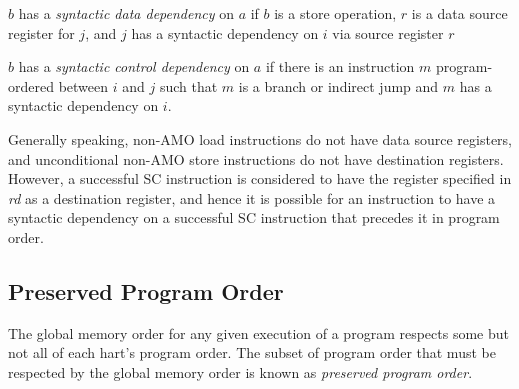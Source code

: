 $b$ has a {\em syntactic data dependency} on $a$ if $b$ is a store operation, $r$ is a data source register for $j$, and $j$ has a syntactic dependency on $i$ via source register $r$

$b$ has a {\em syntactic control dependency} on $a$ if there is an instruction $m$ program-ordered between $i$ and $j$ such that $m$ is a branch or indirect jump and $m$ has a syntactic dependency on $i$.

\begin{commentary}
  Generally speaking, non-AMO load instructions do not have data source registers, and unconditional non-AMO store instructions do not have destination registers.  However, a successful SC instruction is considered to have the register specified in {\em rd} as a destination register, and hence it is possible for an instruction to have a syntactic dependency on a successful SC instruction that precedes it in program order.
\end{commentary}

\subsection*{Preserved Program Order}
The global memory order for any given execution of a program respects some but not all of each hart's program order.
The subset of program order that must be respected by the global memory order is known as {\em preserved program order}.

\newcommand{\ppost}{$b$ is a store, and $a$ and $b$ access overlapping memory addresses}
\newcommand{\ppofence}{There is a FENCE instruction that orders $a$ before $b$}
\newcommand{\ppoacquire}{$a$ has an acquire annotation}
\newcommand{\pporelease}{$b$ has a release annotation}
\newcommand{\pporcsc}{$a$ and $b$ both have RCsc annotations}
\newcommand{\ppoamoforward}{$a$ is generated by an AMO or SC instruction, $b$ is a load, and $b$ returns a value written by $a$}
\newcommand{\ppoaddr}{$b$ has a syntactic address dependency on $a$}
\newcommand{\ppodata}{$b$ has a syntactic data dependency on $a$}
\newcommand{\ppoctrl}{$b$ is a store, and $b$ has a syntactic control dependency on $a$}
\newcommand{\ppopair}{$a$ is paired with $b$}
\newcommand{\ppordw}{$a$ and $b$ are loads, $x$ is a byte read by both $a$ and $b$, there is no store to $x$ between $a$ and $b$ in program order, and $a$ and $b$ return values for $x$ written by different memory operations}
\newcommand{\ppoaddrdatarfi}{$b$ is a load, and there exists some store $m$ between $a$ and $b$ in program order such that $m$ has an address or data dependency on $a$, and $b$ returns a value written by $m$}
\newcommand{\ppoaddrpo}{$b$ is a store, and there exists some instruction $m$ between $a$ and $b$ in program order such that $m$ has an address dependency on $a$}

